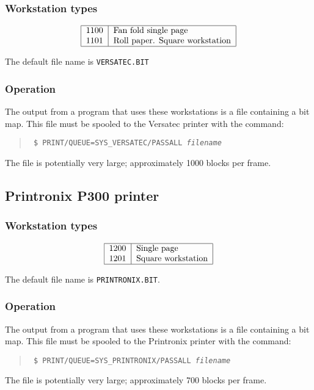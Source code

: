 \subsubsection{Workstation types}
\[\begin{tabular}{|l|l|}\hline
1100 &Fan fold single page\\
1101 &Roll paper. Square workstation\\\hline
\end{tabular}\]

The default file name is {\tt VERSATEC.BIT}

\subsubsection{Operation}
The output from a program that uses these workstations is a file containing a
bit map.
This file must be spooled to the Versatec printer with the command:
\begin{quote}\tt
\$ PRINT/QUEUE=SYS\_VERSATEC/PASSALL {\em filename}
\end{quote}
The file is potentially very large; approximately 1000 blocks per frame.

\subsection{Printronix P300 printer}
\label{prtx}
\subsubsection{Workstation types}
\[\begin{tabular}{|l|l|}\hline
1200 &Single page\\
1201 &Square workstation\\\hline
\end{tabular}\]

The default file name is {\tt PRINTRONIX.BIT}.

\subsubsection{Operation}
The output from a program that uses these workstations is a file containing a
bit map.
This file must be spooled to the Printronix printer with the command:
\begin{quote}\tt
\$ PRINT/QUEUE=SYS\_PRINTRONIX/PASSALL {\em filename}
\end{quote}

The file is potentially very large; approximately 700 blocks per frame.

